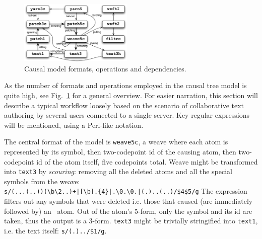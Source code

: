 \documentclass{acm_proc_article-sp}
\begin{document}
\begin{figure} \label{fig:ops}
\includegraphics[width=0.48\textwidth]{operations.pdf}
\caption{Causal model formats, operations and dependencies.}
\end{figure}

As the number of formats and operations employed in the
causal tree model is quite high, see Fig.~\ref{fig:ops}
for a general overview.
For easier narration, this section will describe a
typical workflow loosely based on the scenario of 
collaborative text authoring by several users connected
to a single server. Key regular expressions will be
mentioned, using a Perl-like notation.

The central format of the model is {\tt weave5c}, a weave
where each atom is represented by its symbol, then
two-codepoint id of the causing atom, then two-codepoint
id of the atom itself, five codepoints total.
Weave might be transformed into {\tt text3} by 
\emph{scouring}: removing all the deleted atoms and all
the special symbols from the weave: \\
{\small \verb`s/(...(..))(\b\2..)+|[\b].{4}|.\0.\0.|(.)..(..)/$4$5/g`}
The expression filters out any symbols that were deleted
i.e. those that caused (are immediately followed by) an
\bsp ~atom.
Out of the atom's 5-form, only the symbol and its id are
taken, thus the output is a 3-form. {\tt text3} might be
trivially stringified into {\tt text1}, i.e. the text
itself: {\small \verb`s/(.)../$1/g`}.
\end{document}
